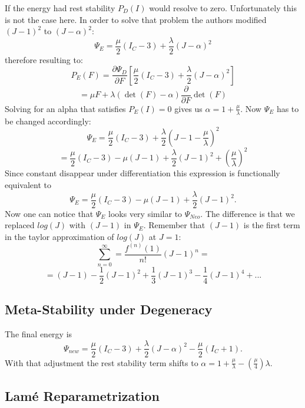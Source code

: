 If the energy had rest stability $P_{D}(I)$ would resolve to zero. Unfortunately this is not the case here. In order to solve that problem the authors modified $(J-1)^{2}$ to $(J-\alpha)^{2}$:
\[
\Psi_{E} = \frac{\mu}{2}\left(I_{C}-3\right) +\frac{\lambda}{2}(J-\alpha)^{2}
\]
therefore resulting to:
\[
P_{E}(F) = \frac{\partial \Psi_{D}}{\partial F} \left[ \frac{\mu}{2}\left(I_{C}-3\right) +\frac{\lambda}{2}(J-\alpha)^{2} \right]
\]
\[
= \mu F + \lambda (\operatorname{det}(F)-\alpha)  \frac{\partial}{\partial F} \operatorname{det}(F)
\]
Solving for an alpha that satisfies $P_{E}(I)=0$ gives us $\alpha=1+\frac{\mu}{\lambda}$. Now $\Psi_{E}$ has to be changed accordingly:
\[
\Psi_{E} = \frac{\mu}{2}\left(I_{C}-3\right) +\frac{\lambda}{2}(J-1-\frac{\mu}{\lambda})^{2}
\]
\[
= \frac{\mu}{2}\left(I_{C}-3\right) - \mu\left(J-1\right) + \frac{\lambda}{2}(J-1)^{2} + \left(\frac{\mu}{\lambda}\right)^{2}
\]
Since constant disappear under differentiation this expression is functionally equivalent to 
\[
\Psi_{E} = \frac{\mu}{2}\left(I_{C}-3\right) - \mu\left(J-1\right) + \frac{\lambda}{2}(J-1)^{2}.
\]
Now one can notice that $\Psi_{E}$ looks very similar to $\Psi_{Neo}$. The difference is that we replaced $log(J)$ with $(J-1)$ in $\Psi_{E}$. Remember that $(J-1)$ is the first term in the taylor approximation of $log(J)$ at $J=1$:
\[
\sum_{n=0}^{\infty} = \frac{f^{(n)}(1)}{n!} (J-1)^{n} =
\]
\[
= (J-1) - \frac{1}{2} (J-1)^{2} + \frac{1}{3} (J-1)^{3} -\frac{1}{4} (J-1)^{4} + ...
\]


\subsection{Meta-Stability under Degeneracy}
The final energy is
\begin{equation}\label{eq:stable_energy}
\Psi_{new} = \frac{\mu}{2}\left(I_{C}-3\right) + \frac{\lambda}{2}(J-\alpha)^{2} - \frac{\mu}{2}\left(I_{C}+1\right).
\end{equation}
With that adjustment the rest stability term shifts to $\alpha=1+\frac{\mu}{\lambda}-\left(\frac{\mu}{4}\right)\lambda$.


\subsection{Lamé Reparametrization}


